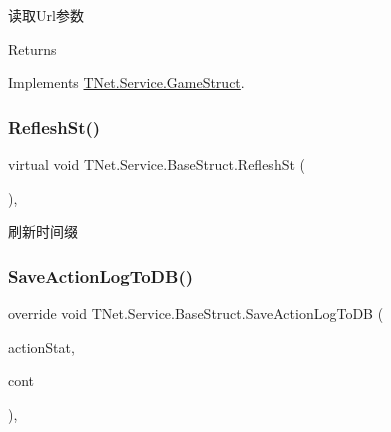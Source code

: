 读取\+Url参数 

\begin{DoxyReturn}{Returns}

\end{DoxyReturn}


Implements \mbox{\hyperlink{class_t_net_1_1_service_1_1_game_struct_ab30ab74b0856742fd3da24539b94fb13}{T\+Net.\+Service.\+Game\+Struct}}.

\mbox{\label{class_t_net_1_1_service_1_1_base_struct_ae25296bf13a95d5f8a2b94c345d18ae6}} 
\subsubsection{\texorpdfstring{Reflesh\+St()}{RefleshSt()}}
{\footnotesize\ttfamily virtual void T\+Net.\+Service.\+Base\+Struct.\+Reflesh\+St (\begin{DoxyParamCaption}{ }\end{DoxyParamCaption})\hspace{0.3cm}{\ttfamily [protected]}, {\ttfamily [virtual]}}



刷新时间缀 

\mbox{\label{class_t_net_1_1_service_1_1_base_struct_ad194547c2bd8ffe7e438af37457b011a}} 
\subsubsection{\texorpdfstring{Save\+Action\+Log\+To\+D\+B()}{SaveActionLogToDB()}}
{\footnotesize\ttfamily override void T\+Net.\+Service.\+Base\+Struct.\+Save\+Action\+Log\+To\+DB (\begin{DoxyParamCaption}\item[{\mbox{\hyperlink{class_t_net_1_1_service_1_1_game_struct_ac7fb463ce72bdf0b12b015c74d2d58da}{Log\+Action\+Stat}}}]{action\+Stat,  }\item[{string}]{cont }\end{DoxyParamCaption})\hspace{0.3cm}{\ttfamily [protected]}, {\ttfamily [virtual]}}



